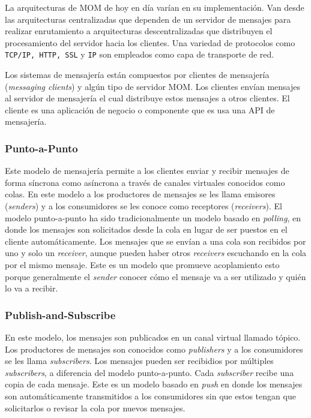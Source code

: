 \documentclass[conference]{IEEEtran}
\begin{document}
La arquitecturas de MOM de hoy en día varían en su implementación. Van desde las arquitecturas centralizadas que dependen de un servidor de mensajes para realizar enrutamiento a arquitecturas descentralizadas que distribuyen el procesamiento del servidor hacia los clientes. Una variedad de protocolos como \texttt{TCP/IP, HTTP, SSL} y \texttt{IP} son empleados como capa de transporte de red.

Los sistemas de mensajería están compuestos por clientes de mensajería (\emph{messaging clients}) y algún tipo de servidor MOM. Los clientes envían mensajes al servidor de mensajería el cual distribuye estos mensajes a otros clientes. El cliente es una aplicación de negocio o componente que es usa una API de mensajería.

\subsubsection{Punto-a-Punto}
Este modelo de mensajería permite a los clientes enviar y recibir mensajes de forma síncrona como asíncrona a través de canales virtuales conocidos como colas. En este modelo a los productores de mensajes se les llama emisores (\emph{senders}) y a los consumidores se les conoce como receptores (\emph{receivers}). El modelo punto-a-punto ha sido tradicionalmente un modelo basado en \emph{polling}, en donde los mensajes son solicitados desde la cola en lugar de ser puestos en el cliente automáticamente. Los mensajes que se envían a una cola son recibidos por uno y solo un \emph{receiver}, aunque pueden haber otros \emph{receivers} escuchando en la cola por el mismo mensaje. Este es un modelo que promueve acoplamiento esto porque generalmente el \emph{sender} conocer cómo el mensaje va a ser utilizado y quién lo va a recibir. 

\subsubsection{Publish-and-Subscribe}
En este modelo, los mensajes son publicados en un canal virtual llamado tópico. Los productores de mensajes son conocidos como \emph{publishers} y a los consumidores se les llama \emph{subscribers}. Los mensajes pueden ser recibidios por múltiples \emph{subscribers}, a diferencia del modelo punto-a-punto. Cada \emph{subscriber} recibe una copia de cada mensaje. Este es un modelo basado en \emph{push} en donde los mensajes son automáticamente transmitidos a los consumidores sin que estos tengan que solicitarlos o revisar la cola por nuevos mensajes. 
\end{document}
